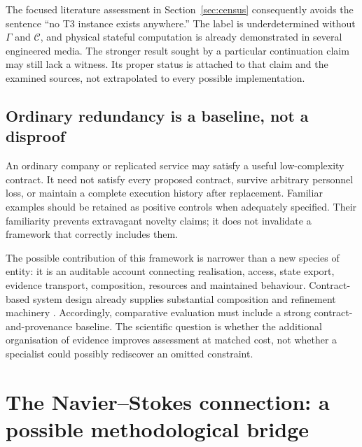 \documentclass[11pt,a4paper]{article}
\theoremstyle{definition}
\theoremstyle{remark}
\begin{document}
The focused literature assessment in Section~\ref{sec:census} consequently avoids the sentence ``no T3 instance exists anywhere.'' The label is underdetermined without $\Gamma$ and $\mathcal C$, and physical stateful computation is already demonstrated in several engineered media. The stronger result sought by a particular continuation claim may still lack a witness. Its proper status is attached to that claim and the examined sources, not extrapolated to every possible implementation.

\subsection{Ordinary redundancy is a baseline, not a disproof}
An ordinary company or replicated service may satisfy a useful low-complexity contract. It need not satisfy every proposed contract, survive arbitrary personnel loss, or maintain a complete execution history after replacement. Familiar examples should be retained as positive controls when adequately specified. Their familiarity prevents extravagant novelty claims; it does not invalidate a framework that correctly includes them.

The possible contribution of this framework is narrower than a new species of entity: it is an auditable account connecting realisation, access, state export, evidence transport, composition, resources and maintained behaviour. Contract-based system design already supplies substantial composition and refinement machinery \citep{contracts}. Accordingly, comparative evaluation must include a strong contract-and-provenance baseline. The scientific question is whether the additional organisation of evidence improves assessment at matched cost, not whether a specialist could possibly rediscover an omitted constraint.


\section{The Navier--Stokes connection: a possible methodological bridge}\label{sec:ns}
\end{document}
